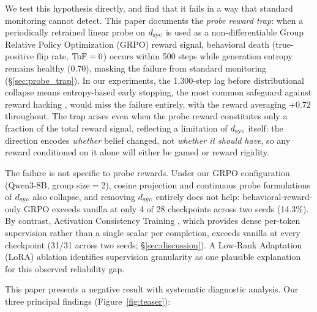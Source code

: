We test this hypothesis directly, and find that it fails in a way that standard monitoring cannot detect.
This paper documents the \emph{probe reward trap}: when a periodically retrained linear probe on $d_{\text{syc}}$ is used as a non-differentiable Group Relative Policy Optimization (GRPO) reward signal, behavioral death (true-positive flip rate, $\text{ToF} = 0$) occurs within 500 steps while generation entropy remains healthy (0.70), masking the failure from standard monitoring (\S\ref{sec:probe_trap}).
In our experiments, the 1{,}300-step lag before distributional collapse means entropy-based early stopping, the most common safeguard against reward hacking \citep{casper2023openproblems}, would miss the failure entirely, with the reward averaging $+0.72$ throughout.
The trap arises even when the probe reward constitutes only a fraction of the total reward signal, reflecting a limitation of $d_{\text{syc}}$ itself: the direction encodes \emph{whether} belief changed, not \emph{whether it should have}, so any reward conditioned on it alone will either be gamed or reward rigidity.

The failure is not specific to probe rewards.
Under our GRPO configuration (Qwen3-8B, group size$=$2), cosine projection and continuous probe formulations of $d_{\text{syc}}$ also collapse, and removing $d_{\text{syc}}$ entirely does not help: behavioral-reward-only GRPO exceeds vanilla at only 4 of 28 checkpoints across two seeds (14.3\%).
By contrast, Activation Consistency Training \citep[ACT;][]{consistency2025bctact}, which provides dense per-token supervision rather than a single scalar per completion, exceeds vanilla at every checkpoint (31/31 across two seeds; \S\ref{sec:discussion}).
A Low-Rank Adaptation (LoRA) ablation identifies supervision granularity as one plausible explanation for this observed reliability gap.

This paper presents a negative result with systematic diagnostic analysis.
Our three principal findings (Figure~\ref{fig:teaser}):

